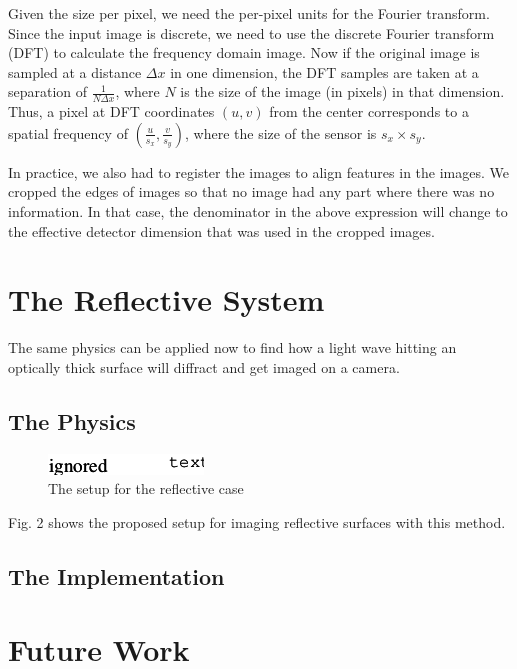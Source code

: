 \documentclass[11pt,a4paper,journal]{IEEEtran}
\begin{document}
Given the size per pixel, we need the per-pixel units for the Fourier transform. Since the input image is discrete, we need to use the discrete Fourier transform (DFT) to calculate the frequency domain image.  Now if the original image is sampled at a distance $\Delta x$ in one dimension, the DFT samples are taken at a separation of $\frac{1}{N\Delta x}$\cite{DFTWiki}, where $N$ is the size of the image (in pixels) in that dimension. Thus, a pixel at DFT coordinates $(u, v)$ from the center corresponds to a spatial frequency of $\left(\frac{u}{s_x}, \frac{v}{s_y}\right)$, where the size of the sensor is $s_x \times s_y$.

In practice, we also had to register the images to align features in the images. We cropped the edges of images so that no image had any part where there was no information. In that case, the denominator in the above expression will change to the effective detector dimension that was used in the cropped images.

\section{The Reflective System}
The same physics can be applied now to find how a light wave hitting an optically thick surface will diffract and get imaged on a camera.

\subsection{The Physics}
\begin{figure}
  \caption{The setup for the reflective case}
  \centering
    \includegraphics[scale=1]{fpm_setup_refl}
\end{figure}
Fig. 2 shows the proposed setup for imaging reflective surfaces with this method.

\subsection{The Implementation}

\section{Future Work}
\end{document}
